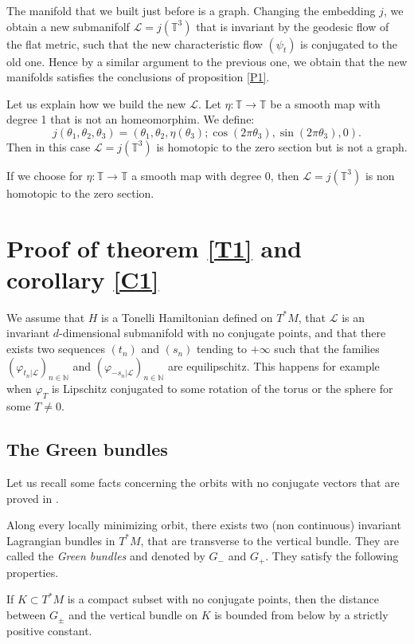 \documentclass{dcds}
\theoremstyle{definition}
\begin{document}
The manifold  that we built just before is a graph. Changing the embedding $j$, we obtain a new submanifolf ${\mathcal {L}}=j({\mathbb {T}}^3)$ that is invariant by the geodesic flow of the flat metric, such that the new characteristic flow $(\psi_t)$ is conjugated to the old one. Hence by a similar argument to the previous one, we obtain that the new manifolds satisfies the conclusions of proposition \ref{P1}.

Let us explain how we build the new ${\mathcal {L}}$. Let $\eta:{\mathbb {T}}\rightarrow {\mathbb {T}}$ be a smooth map with degree 1 that is not an homeomorphim. We define:
$$j(\theta_1, \theta_2, \theta_3)= (\theta_1, \theta_2,\eta( \theta_3); \cos(2\pi\theta_3), \sin(2\pi\theta_3), 0)
.$$
Then in this case ${\mathcal {L}}=j({\mathbb {T}}^3)$ is homotopic to the zero section but is not a graph.

If we choose for $\eta:{\mathbb {T}}\rightarrow {\mathbb {T}}$   a smooth map with degree 0, then ${\mathcal {L}}=j({\mathbb {T}}^3)$ is non homotopic to the zero section.

\section{Proof of theorem \ref{T1} and corollary \ref{C1}}\label{S3}
We assume that $H$ is a Tonelli Hamiltonian defined on $T^*M$, that ${\mathcal {L}}$ is an invariant $d$-dimensional submanifold with no conjugate points, and that there exists two sequences $(t_n)$ and $(s_n)$  tending to $+\infty$ such that the families $(\varphi_{t_n|{\mathcal {L}}})_{n\in{\mathbb {N}}}$ and $(\varphi_{-s_n|{\mathcal {L}}})_{n\in{\mathbb {N}}}$ are equilipschitz. This happens for example when $\varphi_T$ is Lipschitz conjugated to some rotation of the torus or the sphere for some $T\not=0$.

\subsection{The Green bundles}\label{ss31}
Let us recall some facts concerning the orbits with no conjugate vectors that are proved in \cite{Ar1}.

Along every locally minimizing orbit, there exists two (non continuous) invariant Lagrangian bundles in $T^*M$, that are transverse to the vertical bundle. They are called the {\em Green bundles} and denoted by $G_-$ and $G_+$. They satisfy the following properties.

If $K\subset T^*M$ is a compact subset with no conjugate points, then the distance between $G_\pm$ and the vertical bundle on $K$ is bounded from below by a strictly positive constant.
\end{document}
